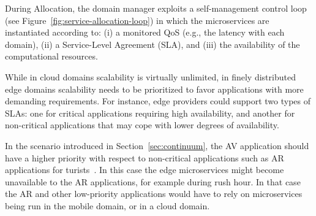 
During Allocation, the domain manager exploits a self-management control loop~\cite{kephart2003vision} (see Figure~\ref{fig:service-allocation-loop}) in which the microservices are instantiated according to: (i) a monitored QoS (e.g., the latency with each domain), (ii) a Service-Level Agreement (SLA), and (iii) the availability of the computational resources. 


While in cloud domains scalability is virtually unlimited, in finely distributed edge domains scalability needs to be prioritized to favor applications with more demanding requirements. For instance, edge providers could support two types of SLAs: one for critical applications requiring high availability, and another for non-critical applications that may cope with lower degrees of availability.  

In the scenario introduced in Section~\ref{sec:continuum}, the AV application should have a higher priority with respect to non-critical applications such as AR applications for turists~\cite{GarrigaMendonca2017}. In this case the edge microservices might become unavailable to the AR applications, for example during rush hour. In that case the AR and other low-priority applications would have to rely on microservices being run in the mobile domain, or in a cloud domain.



